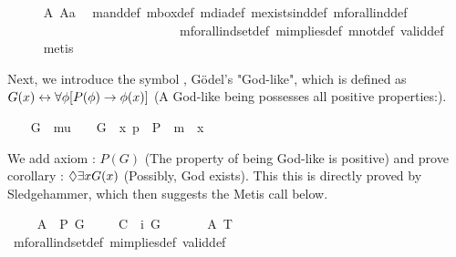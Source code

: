 \begin{isabellebody}
%
\isadelimproof
\ \ \ \ %
\endisadelimproof
%
\isatagproof
{}\isamarkupfalse%
\ A{}\ A{}a\ \isamarkupfalse%
\ mand{\isacharunderscore}def\ mbox{\isacharunderscore}def\ mdia{\isacharunderscore}def\ mexists{\isacharunderscore}ind{\isacharunderscore}def\ mforall{\isacharunderscore}ind{\isacharunderscore}def\ \isanewline
\ \ \ \ \ \ \ \ \ \ \ \ \ \ \ \ \ \ \ \ \ \ \ \ \ \ \ mforall{\isacharunderscore}indset{\isacharunderscore}def\ mimplies{\isacharunderscore}def\ mnot{\isacharunderscore}def\ valid{\isacharunderscore}def\isanewline
\ \ \ \ \isamarkupfalse%
\ metis%
\endisatagproof
{\isafoldproof}%
%
\isadelimproof
%
\endisadelimproof
%
\begin{isamarkuptext}%
Next, we introduce the symbol , G\"odel's "God-like", which is defined 
 as $G(x) \leftrightarrow \forall \phi [P(\phi) \to \phi(x)]$ (A God-like being possesses 
 all positive properties:).%
\end{isamarkuptext}%
\isamarkuptrue%
\ \ \isamarkupfalse%
\ G\ {\isacharcolon}{\isacharcolon}\ {\isachardoublequoteopen}mu\ {\isasymRightarrow}\ {\isasymsigma}{\isachardoublequoteclose}\ \ {\isachardoublequoteopen}G\ {\isacharequal}\ {\isacharparenleft}{\isasymlambda}x{\isachardot}\ {\isasymforall}p\ {\isacharparenleft}{\isasymlambda}{\isasymPhi}{\isachardot}\ P\ {\isasymPhi}\ m{\isasymRightarrow}\ {\isasymPhi}\ x{\isacharparenright}{\isacharparenright}{\isachardoublequoteclose}%
\begin{isamarkuptext}%
We add axiom : $P(G)$ (The property of being God-like is positive) 
 and prove corollary : $\Diamond \exists x G(x)$ (Possibly, God exists). This
 this is directly proved by Sledgehammer, which then suggests the Metis call below.%
\end{isamarkuptext}%
\isamarkuptrue%
\ \ \isamarkupfalse%
\ \ A{}{\isacharcolon}\ \ {\isachardoublequoteopen}{\isacharbrackleft}P\ G{\isacharbrackright}{\isachardoublequoteclose}\ \isanewline
\isanewline
\ \ \isamarkupfalse%
\ C{\isacharcolon}\ {\isachardoublequoteopen}{\isacharbrackleft}{\isasymdiamond}\ {\isacharparenleft}{\isasymexists}i\ G{\isacharparenright}{\isacharbrackright}{\isachardoublequoteclose}\ \isanewline
%
\isadelimproof
\ \ \ \ %
\endisadelimproof
%
\isatagproof
{}\isamarkupfalse%
\ A{}\ T{}\ \isamarkupfalse%
\ mforall{\isacharunderscore}indset{\isacharunderscore}def\ mimplies{\isacharunderscore}def\ valid{\isacharunderscore}def\ \isamarkupfalse%

\end{isabellebody}

